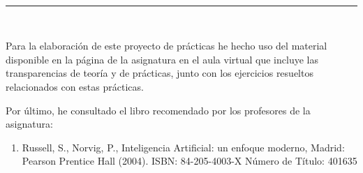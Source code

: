  \begin{center}
	{\fboxrule=4pt } \\
	\rule{15cm}{0pt} \\
\end{center}
\par Para la elaboración de este proyecto de prácticas he hecho uso del material disponible en la página de la asignatura en el aula virtual que incluye las transparencias de teoría y de prácticas, junto con los ejercicios resueltos relacionados con estas prácticas.
\par Por último, he consultado el libro recomendado por los profesores de la asignatura:
\begin{enumerate}
	\item Russell, S., Norvig, P., Inteligencia Artificial: un enfoque moderno, Madrid: Pearson Prentice Hall (2004). ISBN: 84-205-4003-X
	Número de Título: 401635
\end{enumerate}

